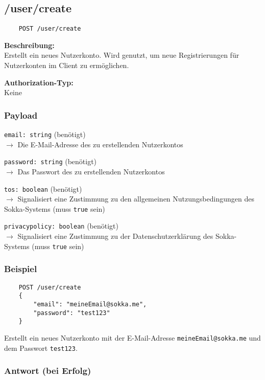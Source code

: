 \subsection{/user/create}
\label{usercreate}

\begin{lstlisting}
    POST /user/create
\end{lstlisting}

\textbf{Beschreibung:} \\
Erstellt ein neues Nutzerkonto. Wird genutzt, um neue Registrierungen für Nutzerkonten im Client zu ermöglichen.

\textbf{Authorization-Typ:} \\
Keine

\subsubsection{Payload}

\lstinline{email: string} (benötigt) \\
$\rightarrow$ Die E-Mail-Adresse des zu erstellenden Nutzerkontos

\lstinline{password: string} (benötigt) \\
$\rightarrow$ Das Passwort des zu erstellenden Nutzerkontos

\lstinline{tos: boolean} (benötigt) \\
$\rightarrow$ Signalisiert eine Zustimmung zu den allgemeinen Nutzungsbedingungen des Sokka-Systems (muss \lstinline{true} sein)

\lstinline{privacypolicy: boolean} (benötigt) \\
$\rightarrow$ Signalisiert eine Zustimmung zu der Datenschutzerklärung des Sokka-Systems (muss \lstinline{true} sein)

\subsubsection{Beispiel}

\begin{lstlisting}
    POST /user/create
    {
        "email": "meineEmail@sokka.me",
        "password": "test123"
    }
\end{lstlisting}

Erstellt ein neues Nutzerkonto mit der E-Mail-Adresse \lstinline{meineEmail@sokka.me} und dem Passwort \lstinline{test123}.

\subsubsection{Antwort (bei Erfolg)}

